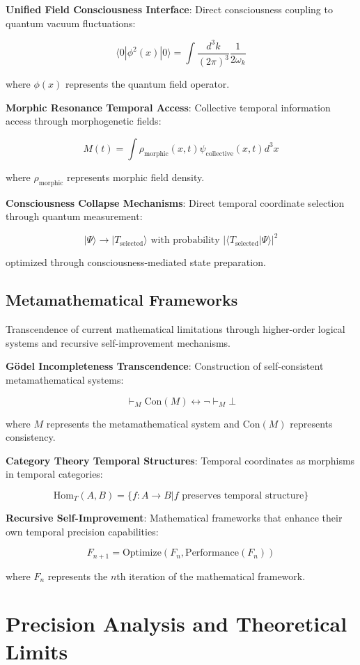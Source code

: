 \documentclass[11pt]{article}
\theoremstyle{remark}
\begin{document}
\textbf{Unified Field Consciousness Interface}: Direct consciousness coupling to quantum vacuum fluctuations:

$$\langle 0|\phi^2(x)|0\rangle = \int \frac{d^3k}{(2\pi)^3} \frac{1}{2\omega_k}$$

where $\phi(x)$ represents the quantum field operator.

\textbf{Morphic Resonance Temporal Access}: Collective temporal information access through morphogenetic fields:

$$M(t) = \int \rho_{\text{morphic}}(x,t) \psi_{\text{collective}}(x,t) d^3x$$

where $\rho_{\text{morphic}}$ represents morphic field density.

\textbf{Consciousness Collapse Mechanisms}: Direct temporal coordinate selection through quantum measurement:

$$|\Psi\rangle \to |T_{\text{selected}}\rangle \text{ with probability } |\langle T_{\text{selected}}|\Psi\rangle|^2$$

optimized through consciousness-mediated state preparation.

\subsection{Metamathematical Frameworks}

Transcendence of current mathematical limitations through higher-order logical systems and recursive self-improvement mechanisms.

\textbf{Gödel Incompleteness Transcendence}: Construction of self-consistent metamathematical systems:

$$\vdash_M \text{Con}(M) \leftrightarrow \neg \vdash_M \bot$$

where $M$ represents the metamathematical system and $\text{Con}(M)$ represents consistency.

\textbf{Category Theory Temporal Structures}: Temporal coordinates as morphisms in temporal categories:

$$\text{Hom}_T(A,B) = \{f: A \to B | f \text{ preserves temporal structure}\}$$

\textbf{Recursive Self-Improvement}: Mathematical frameworks that enhance their own temporal precision capabilities:

$$F_{n+1} = \text{Optimize}(F_n, \text{Performance}(F_n))$$

where $F_n$ represents the $n$th iteration of the mathematical framework.

\section{Precision Analysis and Theoretical Limits}
\end{document}
